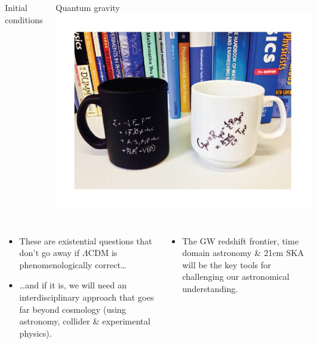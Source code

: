 \documentclass[aspectratio=169, handout]{beamer}
\begin{document}
\begin{frame}
\begin{columns}
\begin{block}{Initial conditions}
        \end{block}
        \begin{block}{Quantum gravity}
            \includegraphics[width=\textwidth]{figures/quantum_gravity.jpeg}
        \end{block}
    \end{columns}
    \begin{columns}
        \begin{itemize}
            \item These are existential questions that don't go away if $\Lambda$CDM is phenomenologically correct\ldots
            \item \ldots and if it is, we will need an interdisciplinary approach that goes far beyond cosmology (using astronomy, collider \& experimental physics).
        \end{itemize}
        \begin{itemize}
            \item The GW redshift frontier, time domain astronomy \& 21cm SKA will be the key tools for challenging our astronomical understanding.
        \end{itemize}
    \end{columns}
\end{frame}
\end{document}
